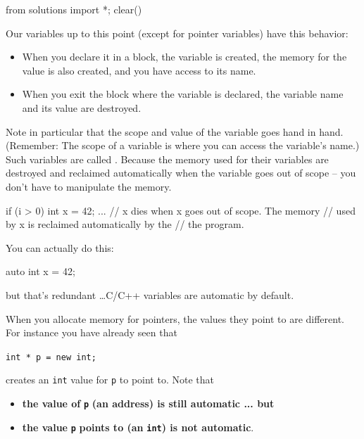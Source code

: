 \begin{python0}
from solutions import *; clear()
\end{python0}

Our variables up to this point (except for pointer variables) have this
behavior:

\begin{itemize}

\item
  When you declare it in a block, the variable is created, the memory
  for the value is also created, and you have access to its name.
\item
  When you exit the block where the variable is declared, the variable
  name and its value are destroyed.
\end{itemize}

Note in particular that the scope and value of the variable goes hand in hand. (Remember: The scope of a variable is where you can access the variable's name.) Such variables are called . Because the memory used for their variables are destroyed and reclaimed automatically when the variable goes out of scope -- you don't have to manipulate the memory.

\begin{consolethree}[escapeinside=||]
if (i > 0)
{
    int x = 42;
    ...
}
// x dies when x goes out of scope. The memory
// used by x is reclaimed automatically by the
// the program.
\end{consolethree}
You can actually do this:

\begin{consolethree}[escapeinside=||]
auto int x = 42;
\end{consolethree}

but that's redundant \ldots C/C++ variables are automatic by default.

When you allocate memory for pointers, the values they point to are different. For instance you have already seen that
\begin{center}
\texttt{int * p = new int;}
\end{center}

creates an \texttt{int} value for \texttt{p} to point to. Note that

\begin{itemize}
\item
  \textbf{the value of }\texttt{\textbf{p}}\textbf{ (an address) is still
  automatic ... but }
\item
  \textbf{the value }\texttt{\textbf{p}}\textbf{ points to (an
  }\texttt{\textbf{int}}\textbf{) is not automatic}.
\end{itemize}

